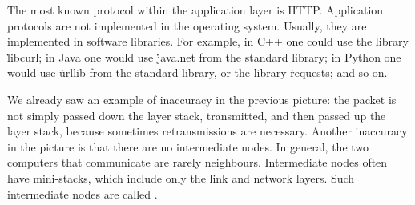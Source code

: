 The most known protocol within the application layer is HTTP\null.
Application protocols are not implemented in the operating system.
Usually, they are implemented in software libraries.
For example,
  in C++ one could use the library \.{libcurl};
  in Java one would use \.{java.net} from the standard library;
  in Python one would use \.{urllib} from the standard library,
    or the library \.{requests};
  and so on.

\smallskip

We already saw an example of inaccuracy in the previous picture:
  the packet is not simply passed down the layer stack,
    transmitted, and then passed up the layer stack,
    because sometimes retransmissions are necessary.
Another inaccuracy in the picture is that there are no intermediate nodes.
In general, the two computers that communicate are rarely neighbours.
Intermediate nodes often have mini-stacks,
  which include only the link and network layers.
Such intermediate nodes are called .

